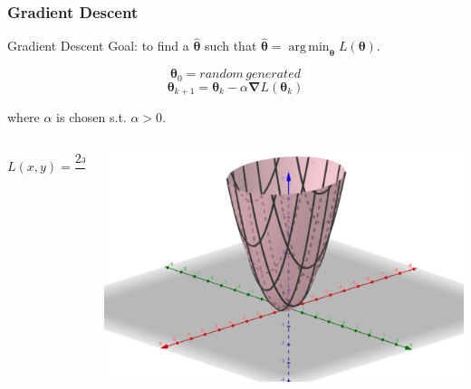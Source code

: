 \documentclass{beamer}
\DeclareMathOperator*{\argmin}{arg\,min}
\begin{document}
\begin{frame}
    
\frametitle{Gradient Descent}
    
\begin{block}{Gradient Descent}
    Goal: to find a $\hat{\boldsymbol{\theta}}$ such that $\hat{\boldsymbol{\theta}} = \argmin_{\boldsymbol{\theta}} L(\boldsymbol{\theta})$.

    \[\boldsymbol{\theta}_{0} = random\,generated\]
    \[\boldsymbol{\theta}_{k + 1} = \boldsymbol{\theta}_{k} - \alpha\boldsymbol{\nabla} L(\boldsymbol{\theta}_{k})\]

    where $\alpha$ is chosen s.t. $\alpha > 0$.
\end{block}

\begin{example}
    \begin{columns}
        \begin{column}{.5\textwidth}
            \[L(x, y) = \frac{2x^{2} + 3y^{2} - 2x + 2y + 1}{3}\]
        \end{column}
        \begin{column}{.4\textwidth}
            \includegraphics[height=.3\textheight]{res/func3d.png}
        \end{column}
    \end{columns}
\end{example}

\end{frame}
\end{document}
